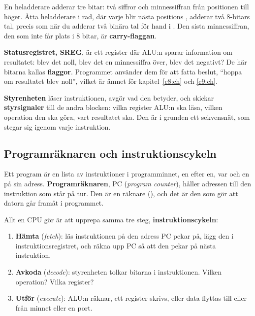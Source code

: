 
En heladderare adderar tre bitar: två siffror och minnessiffran från positionen till höger. Åtta
heladderare i rad, där varje  blir nästa positions , adderar två 8-bitars tal,
precis som när du adderar två binära tal för hand i . Den sista minnessiffran, den
som inte får plats i 8 bitar, är \textbf{carry-flaggan}.

\textbf{Statusregistret, SREG}, är ett register där ALU:n sparar information om resultatet: blev
det noll, blev det en minnessiffra över, blev det negativt? De här bitarna kallas
\textbf{flaggor}. Programmet använder dem för att fatta beslut, \enquote{hoppa om resultatet blev
noll}, vilket är ämnet för kapitel~\ref{c8:ch} och \ref{c9:ch}.

\textbf{Styrenheten} läser instruktionen, avgör vad den betyder, och skickar
\textbf{styrsignaler} till de andra blocken: vilka register ALU:n ska läsa, vilken operation den
ska göra, vart resultatet ska. Den är i grunden ett sekvensnät, som stegar sig igenom varje
instruktion.

\subsection{Programräknaren och instruktionscykeln}
\label{c6:b4}
Ett program är en lista av instruktioner i programminnet, en efter en, var och en på sin adress.
\textbf{Programräknaren}, PC (\emph{program counter}), håller adressen till den instruktion som
står på tur. Den är en räknare (), och det är den som gör att datorn går framåt i
programmet.

Allt en CPU gör är att upprepa samma tre steg, \textbf{instruktionscykeln}:


\begin{enumerate}
  \item \textbf{Hämta} (\emph{fetch}): läs instruktionen på den adress PC pekar på, lägg den i
    instruktionsregistret, och räkna upp PC så att den pekar på nästa instruktion.
  \item \textbf{Avkoda} (\emph{decode}): styrenheten tolkar bitarna i instruktionen. Vilken
    operation? Vilka register?
  \item \textbf{Utför} (\emph{execute}): ALU:n räknar, ett register skrivs, eller data flyttas
    till eller från minnet eller en port.
\end{enumerate}

